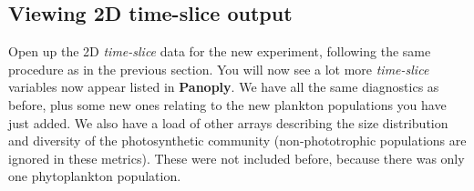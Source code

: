 \documentclass[11pt,fleqn]{book} %
\begin{document}

\subsection{Viewing 2D time-slice output} 

Open up the 2D \textit{time-slice} data for the new experiment, following the same procedure as in the previous section. You will now see a lot more \textit{time-slice} variables now appear listed in \textbf{Panoply}. We have all the same diagnostics as before, plus some new ones relating to the new plankton populations you have just added. We also have a load of other arrays describing the size distribution and diversity of the photosynthetic community (non-phototrophic populations are ignored in these metrics). These were not included before, because there was only one phytoplankton population.
\end{document}

